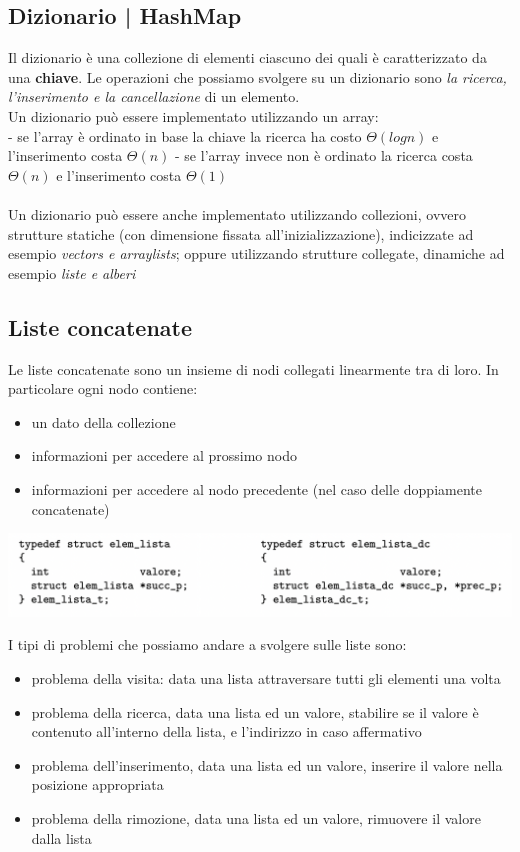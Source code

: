 \documentclass[11pt, oneside]{article}   	%
\begin{document}
\subsection{Dizionario | HashMap}
Il dizionario è una collezione di elementi ciascuno dei quali è caratterizzato da una \textbf{chiave}. Le operazioni che possiamo svolgere su un dizionario sono \emph{la ricerca, l'inserimento e la cancellazione} di un elemento. \\
Un dizionario può essere implementato utilizzando un array:\\
- se l'array è ordinato in base la chiave la ricerca ha costo $\Theta(logn)$ e l'inserimento costa $\Theta(n)$
- se l'array invece non è ordinato la ricerca costa $\Theta(n)$ e l'inserimento costa $\Theta(1)$\\\\
Un dizionario può essere anche implementato utilizzando collezioni, ovvero strutture statiche (con dimensione fissata all'inizializzazione), indicizzate ad esempio \emph{vectors e arraylists}; oppure utilizzando strutture collegate, dinamiche ad esempio \emph{liste e alberi}

\subsection{Liste concatenate}
Le liste concatenate sono un insieme di nodi collegati linearmente tra di loro. In particolare ogni nodo contiene:
\begin{itemize}
\item un dato della collezione
\item informazioni per accedere al prossimo nodo
\item informazioni per accedere al nodo precedente (nel caso delle doppiamente concatenate)
\end{itemize}
\begin{center}
\includegraphics[scale=0.7]{conca}
\end{center}
I tipi di problemi che possiamo andare a svolgere sulle liste sono:
\begin{itemize}
\item problema della visita: data una lista attraversare tutti gli elementi una volta
\item problema della ricerca, data una lista ed un valore, stabilire se il valore è contenuto all'interno della lista, e l'indirizzo in caso affermativo
\item problema dell'inserimento, data una lista ed un valore, inserire il valore nella posizione appropriata
\item problema della rimozione, data una lista ed un valore, rimuovere il valore dalla lista
\end{itemize}
\end{document}

